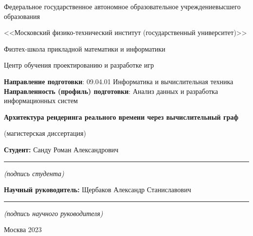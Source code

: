 
\begin{titlepage}
    \begin{center}
    Федеральное государственное автономное образовательное учреждение\break высшего образования\par
    <<Московский физико-технический институт (государственный университет)>>\par
    Физтех-школа прикладной математики и информатики\par
    Центр обучения проектированию и разработке игр\par
    \end{center}
%
    {\bf Направление подготовки}: 09.04.01 Информатика и вычислительная техника\newline
    {\bf Направленность (профиль) подготовки}: Анализ данных и разработка информационных систем\par
%
    {
    \vspace*{\fill}
    \begin{center}
        {\bf\LARGE Архитектура рендеринга реального времени 
        \break через вычислительный граф}\par
        (магистерская диссертация)
    \end{center}
    \vspace*{\fill}
    }
%
    \hfill
    \begin{minipage}[t]{7cm}
    {\bf Студент: \newline}
    Санду Роман Александрович\newline
    \vspace{-3mm}
    \rule{7cm}{0.15mm}
    \centerline{\small\it (подпись студента)}\newline
    {\bf Научный руководитель: \newline}
    Щербаков Александр Станиславович\newline
    \vspace{-3mm}
    \rule{7cm}{0.15mm}
    \centerline{\small\it (подпись научного руководителя)}
    \end{minipage}
    \vspace*{\fill}
    \begin{center}
        Москва 2023
    \end{center}
\end{titlepage}
    
\restoregeometry

